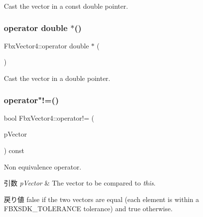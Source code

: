 Cast the vector in a const double pointer. 

\mbox{\label{class_fbx_vector4_aa8d485453c0a2b9160eff2fb2c6c6a02}} 
\subsubsection{\texorpdfstring{operator double $\ast$()}{operator double *()}}
{\footnotesize\ttfamily Fbx\+Vector4\+::operator double $\ast$ (\begin{DoxyParamCaption}{ }\end{DoxyParamCaption})}



Cast the vector in a double pointer. 

\mbox{\label{class_fbx_vector4_ab45035f8dd5def6b990e6e21c4f1e36d}} 
\subsubsection{\texorpdfstring{operator"!=()}{operator!=()}}
{\footnotesize\ttfamily bool Fbx\+Vector4\+::operator!= (\begin{DoxyParamCaption}\item[{const \hyperlink{class_fbx_vector4}{Fbx\+Vector4} \&}]{p\+Vector }\end{DoxyParamCaption}) const}

Non equivalence operator. 
\begin{DoxyParams}{引数}
{\em p\+Vector} & The vector to be compared to {\itshape this}. \\
\hline
\end{DoxyParams}
\begin{DoxyReturn}{戻り値}
{\ttfamily false} if the two vectors are equal (each element is within a F\+B\+X\+S\+D\+K\+\_\+\+T\+O\+L\+E\+R\+A\+N\+CE tolerance) and {\ttfamily true} otherwise. 
\end{DoxyReturn}
\mbox{\label{class_fbx_vector4_aaa3324f6bdec531593e46004db16bdf8}} 
